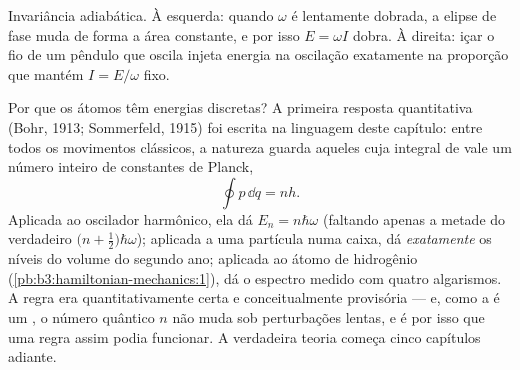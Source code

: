 \begin{omfigure}

{\small Invariância adiabática. À esquerda: quando $\omega$ é lentamente
dobrada, a elipse de fase muda de forma a área constante, e por isso
$E = \omega I$ dobra. À direita: içar o fio de um pêndulo que oscila
injeta energia na oscilação exatamente na proporção que mantém
$I = E/\omega$ fixo.}
\end{omfigure}

\begin{remark}\label{rem:b3:hamiltonian-mechanics:old-quantum}
Por que os átomos têm energias discretas? A primeira resposta
quantitativa (Bohr, 1913; Sommerfeld, 1915) foi escrita na linguagem
deste capítulo: entre todos os movimentos clássicos, a natureza guarda
aqueles cuja integral de  vale um número inteiro de constantes de
Planck,
\[
\oint p\,\dd q = nh .
\]
Aplicada ao oscilador harmônico, ela dá $E_n = n\hbar\omega$ (faltando
apenas a metade do verdadeiro $\big(n + \tfrac12\big)\hbar
\omega$); aplicada a uma partícula numa caixa, dá \emph{exatamente} os
níveis do volume do segundo ano; aplicada ao átomo de hidrogênio
(\cref{pb:b3:hamiltonian-mechanics:1}), dá o espectro medido com quatro
algarismos. A regra era quantitativamente certa e conceitualmente
provisória --- e, como a  é um , o número
quântico $n$ não muda sob perturbações lentas, e é por isso que uma
regra assim podia funcionar. A verdadeira teoria começa cinco capítulos
adiante.
\end{remark}

